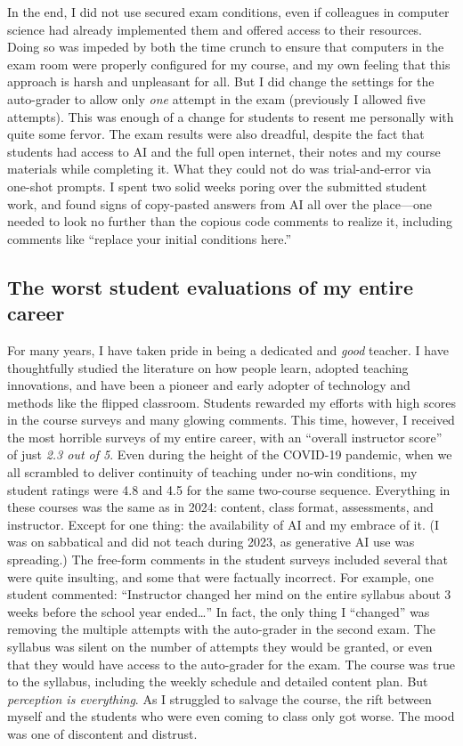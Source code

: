 \documentclass{tufte-handout}
\begin{document}
In the end, I did not use secured exam conditions, even if colleagues in computer science had already implemented them and offered access to their resources. Doing so was impeded by both the time crunch to ensure that computers in the exam room were properly configured for my course, and my own feeling that this approach is harsh and unpleasant for all. But I did change the settings for the auto-grader to allow only \emph{one} attempt in the exam (previously I allowed five attempts). This was enough of a change for students to resent me personally with quite some fervor. The exam results were also dreadful, despite the fact that students had access to AI and the full open internet, their notes and my course materials while completing it. What they could not do was trial-and-error via one-shot prompts. I spent two solid weeks poring over the submitted student work, and found signs of copy-pasted answers from AI all over the place---one needed to look no further than the copious code comments to realize it, including comments like ``replace your initial conditions here.''

\subsection{The worst student evaluations of my entire career }

For many years, I have taken pride in being a dedicated and \emph{good} teacher. I have thoughtfully studied the literature on how people learn, adopted teaching innovations, and have been a pioneer and early adopter of technology and methods like the flipped classroom. Students rewarded my efforts with high scores in the course surveys and many glowing comments. This time, however, I received the most horrible surveys of my entire career, with an ``overall instructor score'' of just \emph{2.3 out of 5}. Even during the height of the COVID-19 pandemic, when we all scrambled to deliver continuity of teaching under no-win conditions, my student ratings were 4.8 and 4.5 for the same two-course sequence. Everything in these courses was the same as in 2024: content, class format, assessments, and instructor. Except for one thing: the availability of AI and my embrace of it. (I was on sabbatical and did not teach during 2023, as generative AI use was spreading.) The free-form comments in the student surveys included several that were quite insulting, and some that were factually incorrect. For example, one student commented: ``Instructor changed her mind on the entire syllabus about 3 weeks before the school year ended…'' In fact, the only thing I ``changed'' was removing the multiple attempts with the auto-grader in the second exam. The syllabus was silent on the number of attempts they would be granted, or even that they would have access to the auto-grader for the exam. The course was true to the syllabus, including the weekly schedule and detailed content plan. But \emph{perception is everything}. As I struggled to salvage the course, the rift between myself and the students who were even coming to class only got worse. The mood was one of discontent and distrust. 
\end{document}
